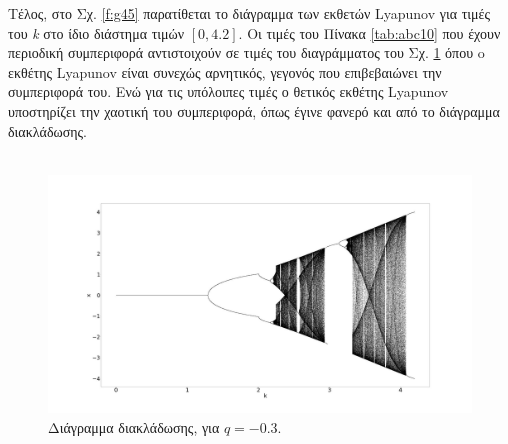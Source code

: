 Τέλος, στο Σχ. \ref{f:g45} παρατίθεται το διάγραμμα των εκθετών Lyapunov για τιμές του \emph{k} στο ίδιο διάστημα τιμών $[0, 4.2]$. Οι τιμές του Πίνακα \ref{tab:abc10} που έχουν περιοδική συμπεριφορά αντιστοιχούν σε τιμές του διαγράμματος του Σχ. \ref{f:g44} όπου o εκθέτης Lyapunov είναι συνεχώς αρνητικός, γεγονός που επιβεβαιώνει την συμπεριφορά του. Ενώ για τις υπόλοιπες τιμές ο θετικός εκθέτης Lyapunov υποστηρίζει την χαοτική του συμπεριφορά, όπως έγινε φανερό και από το διάγραμμα διακλάδωσης.\\\\

\begin{figure}[ht]
	\centering
	\includegraphics[width=1\linewidth]{LateX images/sine q=-0.3/g1}
	\caption{Διάγραμμα διακλάδωσης, για $q=-0.3$.}
	\label{f:g44}
\end{figure}



